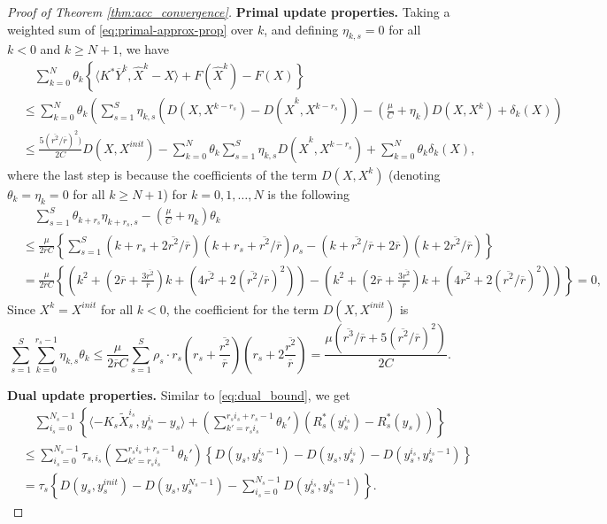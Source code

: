 \documentclass[10pt,a4paper]{amsart}
\begin{document}
\begin{proof}[Proof of Theorem \ref{thm:acc_convergence}]
\textbf{Primal update properties.} Taking a weighted sum of \eqref{eq:primal-approx-prop} over $k$, and defining $\eta_{k,s} = 0$ for all $k< 0$ and $k\geq N+1$, we have
\begin{align*}
    &\quad \sum_{k=0}^N\theta_k\left\{\langle K^* \overline{Y}^k,\widehat{X}^k-X\rangle + F(\widehat{X}^k) - F(X) \right\}\\
    &\leq \sum_{k=0}^N\theta_k\left(\sum_{s=1}^S  \eta_{k,s} \left(D(X,X^{k-r_s})-D(\widehat{X}^k,X^{k-r_s})\right)-(\frac{\mu}{C}+\eta_k)D(X,X^k)+\delta_k(X)\right)\\
    &\leq \frac{5(\overline{r^2}/\overline{r})^2)}{2C}D(X,X^{init})-\sum_{k=0}^N\theta_k\sum_{s=1}^S  \eta_{k,s} D(\widehat{X}^k,X^{k-r_s})+\sum_{k=0}^N\theta_k\delta_k(X),
\end{align*}
where the last step is because the coefficients of the term $D(X,X^k)$ (denoting $\theta_k = \eta_{k} = 0$ for all $k\geq N+1$) for $k=0,1,\ldots,N$ is the following
\begin{align*}
    &\quad \sum_{s= 1}^S \theta_{k+r_s}\eta_{k+r_s,s} - (\frac{\mu}{C}+\eta_k)\theta_k\\
    &\leq \frac{\mu}{2\overline{r}C}\left\{\sum_{s= 1}^S (k+r_s+2\overline{r^2}/\overline{r})(k+r_s+\overline{r^2}/\overline{r})\rho_s- (k+\overline{r^2}/\overline{r}+2\overline{r})(k+2\overline{r^2}/\overline{r})\right\}\\
    & = \frac{\mu}{2\overline{r}C}\left\{ \left( k^2 + (2\overline{r} + \frac{3\overline{r^2}}{\overline{r}})k + (4\overline{r^2} + 2(\overline{r^2}/\overline{r})^2) \right)-\left(k^2 + (2\overline{r} + \frac{3\overline{r^2}}{\overline{r}})k +  (4\overline{r^2} + 2(\overline{r^2}/\overline{r})^2)\right)\right\}= 0,
\end{align*}
Since $X^{k} = X^{init}$ for all $k<0$, the coefficient for the term $D(X,X^{init})$ is 
\begin{displaymath}
    \sum_{s=1}^S \sum_{k=0}^{r_s-1} \eta_{k,s}\theta_{k}  \leq  \frac{\mu }{2\overline{r}C}\sum_{s=1}^S \rho_s\cdot r_s(r_s +\frac{\overline{r^2}}{\overline{r}})(r_s +2\frac{\overline{r^2}}{\overline{r}})=\frac{\mu(\overline{r^3}/\overline{r} + 5(\overline{r^2}/\overline{r})^2)}{2C}. 
\end{displaymath}


\textbf{Dual update properties.} Similar to \eqref{eq:dual_bound}, we get 
\begin{align}\label{eq:dual_bound2}
     &\quad \sum_{i_s=0}^{N_s-1}\left\{\langle -K_s\widetilde{X}_{s}^{i_s},y_s^{i_s}-y_s\rangle + (\sum_{k'=r_si_s}^{r_si_s+r_s-1}\theta_k')(R^*_s(y_s^{i_s})  - R^*_s(y_s))\right\}\nonumber\\
     &\leq \sum_{i_s=0}^{N_s-1} \tau_{s,i_s}(\sum_{k'=r_si_s}^{r_si_s+r_s-1}\theta_k')\left\{D(y_s,y_s^{i_s-1}) - D(y_s,y_s^{i_s})-D(y^{i_s}_s,y_s^{i_s-1})\right\}\nonumber\\
     &=  \tau_{s}\left\{D(y_s,y_s^{init}) - D(y_s,y_s^{N_s-1})-\sum_{i_s=0}^{N_s-1} D(y^{i_s}_s,y_s^{i_s-1})\right\}.
\end{align}


\end{proof}
\end{document}
